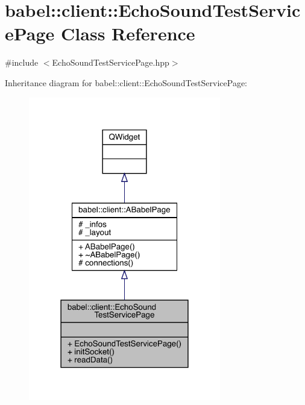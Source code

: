 \hypertarget{classbabel_1_1client_1_1_echo_sound_test_service_page}{}\section{babel\+:\+:client\+:\+:Echo\+Sound\+Test\+Service\+Page Class Reference}
\label{classbabel_1_1client_1_1_echo_sound_test_service_page}


{\ttfamily \#include $<$Echo\+Sound\+Test\+Service\+Page.\+hpp$>$}



Inheritance diagram for babel\+:\+:client\+:\+:Echo\+Sound\+Test\+Service\+Page\+:\nopagebreak
\begin{figure}[H]
\begin{center}
\leavevmode
\includegraphics[width=238pt]{classbabel_1_1client_1_1_echo_sound_test_service_page__inherit__graph}
\end{center}
\end{figure}


